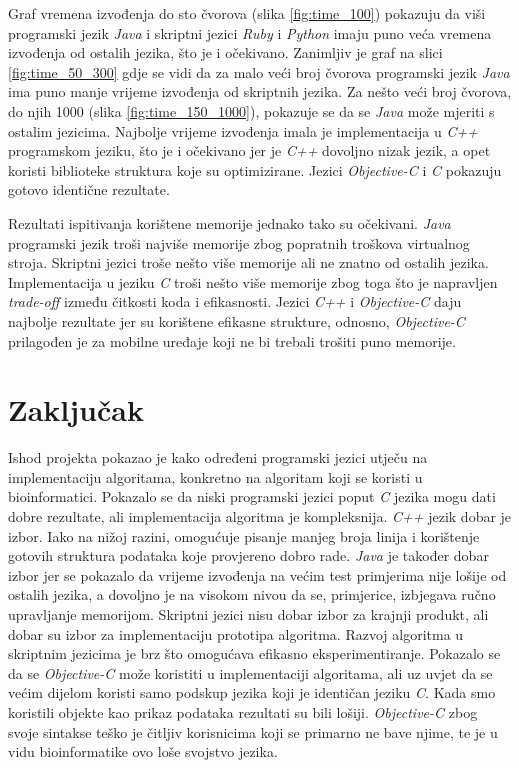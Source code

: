\documentclass[times, utf8, seminar, numeric]{fer}
\begin{document}
Graf vremena izvođenja do sto čvorova (slika \ref{fig:time_100}) pokazuju da viši programski jezik \emph{Java} i skriptni jezici \emph{Ruby} i \emph{Python} imaju puno veća vremena izvođenja od ostalih jezika, što je i očekivano. Zanimljiv je graf na slici \ref{fig:time_50_300} gdje se vidi da za malo veći broj čvorova programski jezik \emph{Java} ima puno manje vrijeme izvođenja od skriptnih jezika. Za nešto veći broj čvorova, do njih 1000 (slika \ref{fig:time_150_1000}), pokazuje se da se \emph{Java} može mjeriti s ostalim jezicima. Najbolje vrijeme izvođenja imala je implementacija u \emph{C++} programskom jeziku, što je i očekivano jer je \emph{C++} dovoljno nizak jezik, a opet koristi biblioteke struktura koje su optimizirane. Jezici \emph{Objective-C} i \emph{C} pokazuju gotovo identične rezultate.

Rezultati ispitivanja korištene memorije jednako tako su očekivani. \emph{Java} programski jezik troši najviše memorije zbog popratnih troškova virtualnog stroja. Skriptni jezici troše nešto više memorije ali ne znatno od ostalih jezika. Implementacija u jeziku \emph{C} troši nešto više memorije zbog toga što je napravljen \emph{trade-off} između čitkosti koda i efikasnosti. Jezici \emph{C++} i \emph{Objective-C} daju najbolje rezultate jer su korištene efikasne strukture, odnosno, \emph{Objective-C} prilagođen je za mobilne uređaje koji ne bi trebali trošiti puno memorije.

\chapter{Zaključak}

Ishod projekta pokazao je kako određeni programski jezici utječu na implementaciju algoritama, konkretno na algoritam koji se koristi u bioinformatici. Pokazalo se da niski programski jezici poput \emph{C} jezika mogu dati dobre rezultate, ali implementacija algoritma je kompleksnija. \emph{C++} jezik dobar je izbor. Iako na nižoj razini, omogućuje pisanje manjeg broja linija i korištenje gotovih struktura podataka koje provjereno dobro rade. \emph{Java} je također dobar izbor jer se pokazalo da vrijeme izvođenja na većim test primjerima nije lošije od ostalih jezika, a dovoljno je na visokom nivou da se, primjerice, izbjegava ručno upravljanje memorijom. Skriptni jezici nisu dobar izbor za krajnji produkt, ali dobar su izbor za implementaciju prototipa algoritma. Razvoj algoritma u skriptnim jezicima je brz što omogućava efikasno eksperimentiranje. Pokazalo se da se \emph{Objective-C} može koristiti u implementaciji algoritama, ali uz uvjet da se većim dijelom koristi samo podskup jezika koji je identičan jeziku \emph{C}. Kada smo koristili objekte kao prikaz podataka rezultati su bili lošiji. \emph{Objective-C} zbog svoje sintakse teško je čitljiv korisnicima koji se primarno ne bave njime, te je u vidu bioinformatike ovo loše svojstvo jezika.
\end{document}
